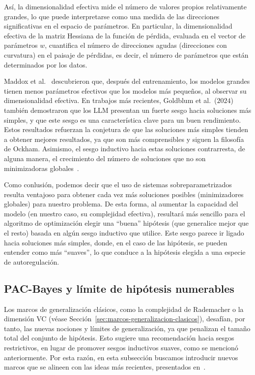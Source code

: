 Así, la dimensionalidad efectiva mide el número de valores propios relativamente grandes, lo que puede interpretarse como una medida de las direcciones significativas en el espacio de parámetros. En particular, la dimensionalidad efectiva de la matriz Hessiana de la función de pérdida, evaluada en el vector de parámetros $w$, cuantifica el número de direcciones agudas (direcciones con curvatura) en el paisaje de pérdidas, es decir, el número de parámetros que están determinados por los datos.

Maddox et al.~\cite{Maddox2020} descubrieron que, después del entrenamiento, los modelos grandes tienen menos parámetros efectivos que los modelos más pequeños, al observar su dimensionalidad efectiva. En trabajos más recientes, Goldblum et al.~($2024$)~\cite{Goldblum2024} también demostraron que los LLM presentan un fuerte sesgo hacia soluciones más simples, y que este sesgo es una característica clave para un buen rendimiento. Estos resultados refuerzan la conjetura de que las soluciones más simples tienden a obtener mejores resultados, ya que son más comprensibles y siguen la filosofía de Ockham. Asimismo, el sesgo inductivo hacia estas soluciones contrarresta, de alguna manera, el crecimiento del número de soluciones que no son minimizadoras globales~\cite{Mingard2023}.

Como conlusión, podemos decir que el uso de sistemas sobreparametrizados resulta ventajoso para obtener cada vez más soluciones posibles (minimizadores globales) para nuestro problema. De esta forma, al aumentar la capacidad del modelo (en nuestro caso, su complejidad efectiva), resultará más sencillo para el algoritmo de optimización elegir una ``buena'' hipótesis (que generalice mejor que el resto) basada en algún sesgo inductivo que utilice. Este sesgo parece ir ligado hacia soluciones más simples, donde, en el caso de las hipótesis, se pueden entender como más ``suaves'', lo que conduce a la hipótesis elegida a una especie de autoregulación.

\subsection{PAC-Bayes y límite de hipótesis numerables}\label{subsec:pac-bayes}

Los marcos de generalización clásicos, como la complejidad de Rademacher o la dimensión VC (véase Sección~\ref{sec:marcos-generalizacion-clasicos}), desafían, por tanto, las nuevas nociones y límites de generalización, ya que penalizan el tamaño total del conjunto de hipótesis. Esto sugiere una recomendación hacia sesgos restrictivos, en lugar de promover sesgos inductivos suaves, como se mencionó anteriormente. Por esta razón, en esta subsección buscamos introducir nuevos marcos que se alineen con las ideas más recientes, presentados en~\cite{Wilson2025}.

